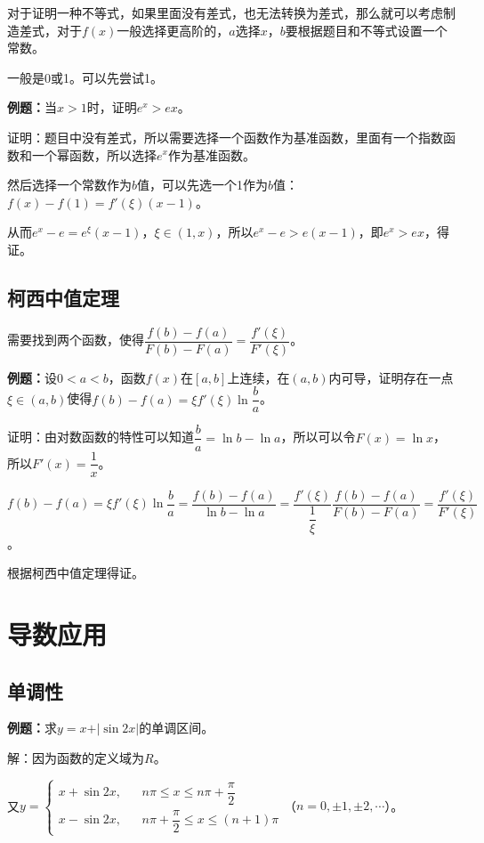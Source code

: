 \documentclass[UTF8, 12pt]{ctexart}
\begin{document}
对于证明一种不等式，如果里面没有差式，也无法转换为差式，那么就可以考虑制造差式，对于$f(x)$一般选择更高阶的，$a$选择$x$，$b$要根据题目和不等式设置一个常数。

一般是0或1。可以先尝试1。

\textbf{例题：}当$x>1$时，证明$e^x>ex$。

证明：题目中没有差式，所以需要选择一个函数作为基准函数，里面有一个指数函数和一个幂函数，所以选择$e^x$作为基准函数。

然后选择一个常数作为$b$值，可以先选一个1作为$b$值：$f(x)-f(1)=f'(\xi)(x-1)$。

从而$e^x-e=e^\xi(x-1)$，$\xi\in(1,x)$，所以$e^x-e>e(x-1)$，即$e^x>ex$，得证。

\subsection{柯西中值定理}

需要找到两个函数，使得$\dfrac{f(b)-f(a)}{F(b)-F(a)}=\dfrac{f'(\xi)}{F'(\xi)}$。

\textbf{例题：}设$0<a<b$，函数$f(x)$在$[a,b]$上连续，在$(a,b)$内可导，证明存在一点$\xi\in(a,b)$使得$f(b)-f(a)=\xi f'(\xi)\ln\dfrac{b}{a}$。

证明：由对数函数的特性可以知道$\dfrac{b}{a}=\ln b-\ln a$，所以可以令$F(x)=\ln x$，所以$F'(x)=\dfrac{1}{x}$。

$f(b)-f(a)=\xi f'(\xi)\ln\dfrac{b}{a}=\dfrac{f(b)-f(a)}{\ln b-\ln a}=\dfrac{f'(\xi)}{\dfrac{1}{\xi}}\dfrac{f(b)-f(a)}{F(b)-F(a)}=\dfrac{f'(\xi)}{F'(\xi)}$。

根据柯西中值定理得证。

\section{导数应用}

\subsection{单调性}

\textbf{例题：}求$y=x+\vert\sin 2x\vert$的单调区间。

解：因为函数的定义域为$R$。

又$y=\left\{\begin{array}{lcl}
    x+\sin 2x, & & n\pi\leqslant x\leqslant n\pi+\dfrac{\pi}{2} \\
    x-\sin 2x, & &n\pi+\dfrac{\pi}{2}\leqslant x\leqslant (n+1)\pi
\end{array}\right.$（$n=0,\pm 1,\pm2,\cdots$）。
\end{document}
